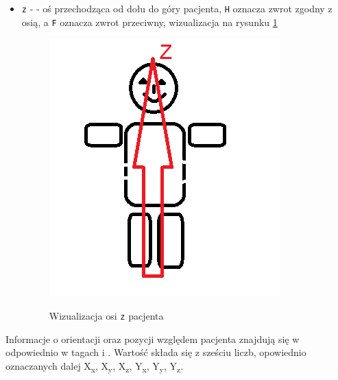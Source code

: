 \begin{itemize}
\begin{itemize}
        \item \texttt{z} -  - oś przechodząca od dołu do góry pacjenta, \texttt{H} oznacza zwrot zgodny z osią, a \texttt{F} oznacza zwrot przeciwny, wizualizacja na rysunku \ref{fig:imageorientationindicator4}

        \begin{figure}[h]
            \caption{Wizualizacja osi \texttt{z} pacjenta}
            \includegraphics[]{img/imageorientationindicator-103.png}
            \centering
            \label{fig:imageorientationindicator4}
        \end{figure}

    \end{itemize}

    Informacje o orientacji oraz pozycji względem pacjenta znajdują się w odpowiednio w tagach  i .
    Wartość  składa się z sześciu liczb, opowiednio oznaczanych dalej X\textsubscript{x}, X\textsubscript{y}, X\textsubscript{z}, Y\textsubscript{x}, Y\textsubscript{y}, Y\textsubscript{z}.


\end{itemize}

